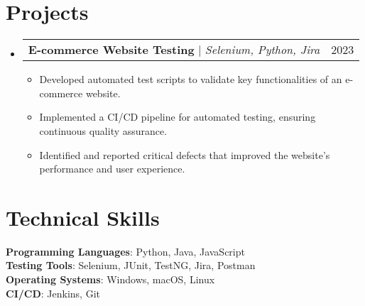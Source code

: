 \documentclass[letterpaper,11pt]{article}
\makeatletter
\newcommand{\resumeItem}[1]{
\item\small{
{#1 \vspace{-2pt}}
}
}
\newcommand{\resumeProjectHeading}[2]{
\item
\begin{tabular*}{0.97\textwidth}{l@{\extracolsep{\fill}}r}
\small#1 & #2 \\
\end{tabular*}\vspace{-7pt}
}
\newcommand{\resumeSubHeadingListStart}{\begin{itemize}[leftmargin=0.15in, label={}]}
\newcommand{\resumeSubHeadingListEnd}{\end{itemize}}
\newcommand{\resumeItemListStart}{\begin{itemize}}
\newcommand{\resumeItemListEnd}{\end{itemize}\vspace{-5pt}}
\makeatother
\begin{document}
\section{Projects}
\resumeSubHeadingListStart
\resumeProjectHeading{\textbf{E-commerce Website Testing} $|$ \emph{Selenium, Python, Jira}}{2023}
\resumeItemListStart
\resumeItem{Developed automated test scripts to validate key functionalities of an e-commerce website.}
\resumeItem{Implemented a CI/CD pipeline for automated testing, ensuring continuous quality assurance.}
\resumeItem{Identified and reported critical defects that improved the website's performance and user experience.}
\resumeItemListEnd
\resumeSubHeadingListEnd

\section{Technical Skills} %
\begin{itemize}[leftmargin=0.15in, label={}]
\small{\item{\textbf{Programming Languages}{: Python, Java, JavaScript} \\
\textbf{Testing Tools}{: Selenium, JUnit, TestNG, Jira, Postman} \\
\textbf{Operating Systems}{: Windows, macOS, Linux} \\
\textbf{CI/CD}{: Jenkins, Git} }}
\end{itemize}


\end{document}

